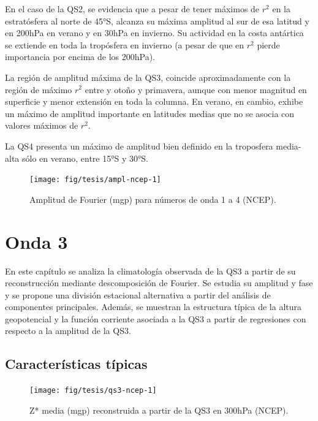 \documentclass[spanish,a4paper,12pt,oneside]{book}
\begin{document}
En el caso de la QS2, se evidencia que a pesar de tener máximos de
\(r^2\) en la estratósfera al norte de 45°S, alcanza su máxima amplitud
al sur de esa latitud y en 200hPa en verano y en 30hPa en invierno. Su
actividad en la costa antártica se extiende en toda la tropósfera en
invierno (a pesar de que en \(r^2\) pierde importancia por encima de los
200hPa).

La región de amplitud máxima de la QS3, coincide aproximadamente con la
región de máximo \(r^2\) entre y otoño y primavera, aunque con menor
magnitud en superficie y menor extensión en toda la columna. En verano,
en cambio, exhibe un máximo de amplitud importante en latitudes medias
que no se asocia con valores máximos de \(r^2\).

La QS4 presenta un máximo de amplitud bien definido en la troposfera
media-alta sólo en verano, entre 15°S y 30°S.

\begin{landscape}\begin{figure}

{\centering \texttt{[image: fig/tesis/ampl-ncep-1]} 

}

\caption{Amplitud de Fourier (mgp) para números de onda 1 a 4 (NCEP).}\label{fig:ampl-ncep}
\end{figure}
\end{landscape}

\chapter{Onda 3}\label{onda-3}

En este capítulo se analiza la climatología observada de la QS3 a partir
de su reconstrucción mediante descomposición de Fourier. Se estudia su
amplitud y fase y se propone una división estacional alternativa a
partir del análisis de componentes principales. Además, se muestran la
estructura típica de la altura geopotencial y la función corriente
asociada a la QS3 a partir de regresiones con respecto a la amplitud de
la QS3.

\section{Características típicas}\label{caracteristicas-tipicas}

\begin{figure}
\texttt{[image: fig/tesis/qs3-ncep-1]} \caption{Z* media (mgp) reconstruida a partir de la QS3 en 300hPa (NCEP).}\label{fig:qs3-ncep}
\end{figure}
\end{document}

